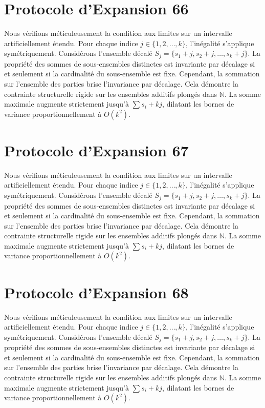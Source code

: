 \documentclass[12pt, a4paper, french]{article}
\theoremstyle{definition}
\begin{document}
\section{Protocole d'Expansion 66}
Nous vérifions méticuleusement la condition aux limites sur un intervalle artificiellement étendu. Pour chaque indice $j \in \{1, 2, \dots, k\}$, l'inégalité s'applique symétriquement. Considérons l'ensemble décalé $S_j = \{s_1 + j, s_2 + j, \dots, s_k + j\}$. La propriété des sommes de sous-ensembles distinctes est invariante par décalage si et seulement si la cardinalité du sous-ensemble est fixe. Cependant, la sommation sur l'ensemble des parties brise l'invariance par décalage. Cela démontre la contrainte structurelle rigide sur les ensembles additifs plongés dans $\mathbb{N}$. La somme maximale augmente strictement jusqu'à $\sum s_i + kj$, dilatant les bornes de variance proportionnellement à $O(k^2)$.

\section{Protocole d'Expansion 67}
Nous vérifions méticuleusement la condition aux limites sur un intervalle artificiellement étendu. Pour chaque indice $j \in \{1, 2, \dots, k\}$, l'inégalité s'applique symétriquement. Considérons l'ensemble décalé $S_j = \{s_1 + j, s_2 + j, \dots, s_k + j\}$. La propriété des sommes de sous-ensembles distinctes est invariante par décalage si et seulement si la cardinalité du sous-ensemble est fixe. Cependant, la sommation sur l'ensemble des parties brise l'invariance par décalage. Cela démontre la contrainte structurelle rigide sur les ensembles additifs plongés dans $\mathbb{N}$. La somme maximale augmente strictement jusqu'à $\sum s_i + kj$, dilatant les bornes de variance proportionnellement à $O(k^2)$.

\section{Protocole d'Expansion 68}
Nous vérifions méticuleusement la condition aux limites sur un intervalle artificiellement étendu. Pour chaque indice $j \in \{1, 2, \dots, k\}$, l'inégalité s'applique symétriquement. Considérons l'ensemble décalé $S_j = \{s_1 + j, s_2 + j, \dots, s_k + j\}$. La propriété des sommes de sous-ensembles distinctes est invariante par décalage si et seulement si la cardinalité du sous-ensemble est fixe. Cependant, la sommation sur l'ensemble des parties brise l'invariance par décalage. Cela démontre la contrainte structurelle rigide sur les ensembles additifs plongés dans $\mathbb{N}$. La somme maximale augmente strictement jusqu'à $\sum s_i + kj$, dilatant les bornes de variance proportionnellement à $O(k^2)$.
\end{document}
